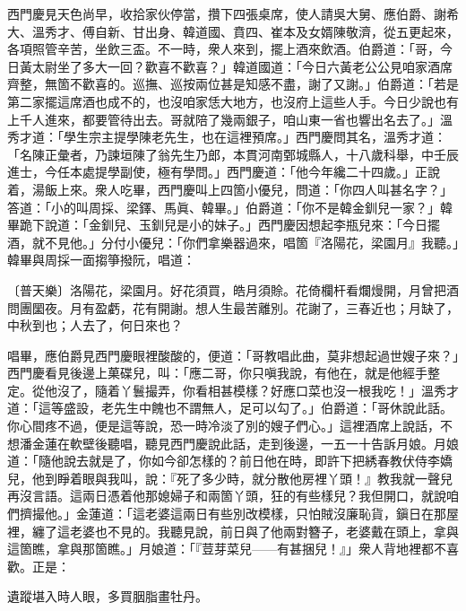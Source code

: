 西門慶見天色尚早，收拾家伙停當，攢下四張桌席，使人請吳大舅、應伯爵、謝希大、溫秀才、傅自新、甘出身、韓道國、賁四、崔本及女婿陳敬濟，從五更起來，各項照管辛苦，坐飲三盃。不一時，衆人來到，擺上酒來飲酒。伯爵道：「哥，今日黃太尉坐了多大一回？歡喜不歡喜？」韓道國道：「今日六黃老公公見咱家酒席齊整，無箇不歡喜的。巡撫、巡按兩位甚是知感不盡，謝了又謝。」伯爵道：「若是第二家擺這席酒也成不的，也沒咱家恁大地方，也沒府上這些人手。今日少說也有上千人進來，都要管待出去。哥就陪了幾兩銀子，咱山東一省也響出名去了。」溫秀才道：「學生宗主提學陳老先生，也在這裡預席。」{}西門慶問其名，溫秀才道：「名陳正彙者，乃諫垣陳了翁先生乃郎，本貫河南鄄城縣人，十八歲科舉，中壬辰進士，今任本處提學副使，極有學問。」西門慶道：「他今年纔二十四歲。」正說着，湯飯上來。衆人吃畢，西門慶叫上四箇小優兒，問道：「你四人叫甚名字？」答道：「小的叫周採、梁鐸、馬眞、韓畢。」伯爵道：「你不是韓金釧兒一家？」韓畢跪下說道：「金釧兒、玉釧兒是小的妹子。」西門慶因想起李瓶兒來：「今日擺酒，就不見他。」分付小優兒：「你們拿樂器過來，唱箇『洛陽花，梁園月』我聽。」韓畢與周採一面搊箏撥阮，唱道：

\begin{myquote} 
{\markfont\small{〔普天樂〕}}洛陽花，梁園月。好花須買，皓月須賒。花倚欄杆看爛熳開，月曾把酒問團圞夜。月有盈虧，花有開謝。想人生最苦離別。花謝了，三春近也；月缺了，中秋到也；人去了，何日來也？{}
\end{myquote} 

唱畢，應伯爵見西門慶眼裡酸酸的，便道：「哥教唱此曲，莫非想起過世嫂子來？」西門慶看見後邊上菓碟兒，叫：「應二哥，你只嗔我說，有他在，就是他經手整定。從他沒了，隨着丫鬟撮弄，你看相甚模樣？好應口菜也沒一根我吃！」{}溫秀才道：「這等盛設，老先生中餽也不謂無人，足可以勾了。」伯爵道：「哥休說此話。你心間疼不過，便是這等說，恐一時冷淡了別的嫂子們心。」{}這裡酒席上說話，不想潘金蓮在軟壁後聽唱，聽見西門慶說此話，走到後邊，一五一十告訴月娘。月娘道：「隨他說去就是了，你如今卻怎樣的？前日他在時，即許下把綉春教伏侍李嬌兒，他到睜着眼與我叫，說：『死了多少時，就分散他房裡丫頭！』教我就一聲兒再沒言語。這兩日憑着他那媳婦子和兩箇丫頭，狂的有些樣兒？我但開口，就說咱們擠撮他。」金蓮道：「這老婆這兩日有些別改模樣，只怕賊沒廉恥貨，鎭日在那屋裡，纏了這老婆也不見的。我聽見說，前日與了他兩對簪子，老婆戴在頭上，拿與這箇瞧，拿與那箇瞧。」月娘道：「『荳芽菜兒——有甚捆兒！』」衆人背地裡都不喜歡。正是：

\begin{myquote} 
遺蹤堪入時人眼，多買胭脂畫牡丹。
\end{myquote} 

